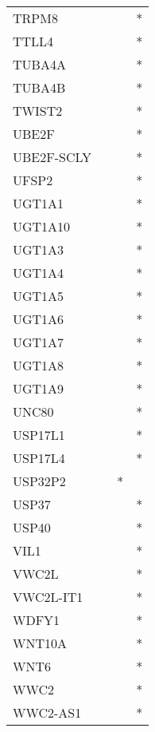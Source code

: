 \begin{longtable}{lccc}
TRPM8          &           &     &       * \\
TTLL4          &           &     &       * \\
TUBA4A         &           &     &       * \\
TUBA4B         &           &     &       * \\
TWIST2         &           &     &       * \\
UBE2F          &           &     &       * \\
UBE2F-SCLY     &           &     &       * \\
UFSP2          &           &     &       * \\
UGT1A1         &           &     &       * \\
UGT1A10        &           &     &       * \\
UGT1A3         &           &     &       * \\
UGT1A4         &           &     &       * \\
UGT1A5         &           &     &       * \\
UGT1A6         &           &     &       * \\
UGT1A7         &           &     &       * \\
UGT1A8         &           &     &       * \\
UGT1A9         &           &     &       * \\
UNC80          &           &     &       * \\
USP17L1        &           &     &       * \\
USP17L4        &           &     &       * \\
USP32P2        &           &   * &         \\
USP37          &           &     &       * \\
USP40          &           &     &       * \\
VIL1           &           &     &       * \\
VWC2L          &           &     &       * \\
VWC2L-IT1      &           &     &       * \\
WDFY1          &           &     &       * \\
WNT10A         &           &     &       * \\
WNT6           &           &     &       * \\
WWC2           &           &     &       * \\
WWC2-AS1       &           &     &       * \\

\end{longtable}
